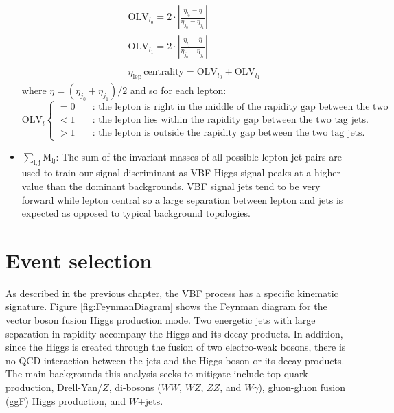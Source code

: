 \begin{itemize}
\begin{eqnarray}
&& \textrm{OLV}_{l_0} = 2 \cdot |\frac{\eta_{l_0}-\bar{\eta}}{\eta_{j_0}-\eta_{j_1}}|  \nonumber\\
&& \textrm{OLV}_{l_1} = 2 \cdot |\frac{\eta_{l_1}-\bar{\eta}}{\eta_{j_0}-\eta_{j_1}}|  \nonumber\\
&&\nonumber \\
&& \eta_{\mathrm{lep}} \, \textrm{centrality} = \textrm{OLV}_{l_0} + \textrm{OLV}_{l_1}
\label{eqn:contOLV_def}
\end{eqnarray}
where $\bar{\eta} = (\eta_{j_0} + \eta_{j_1})/2$ and so for each lepton: 
 \begin{equation}
   \textrm{OLV}_l \left\{
   \begin{array} {ll}
     = 0 & \quad \textrm{:  the lepton is right in the middle of the rapidity gap between the two tag jets.} \\
     < 1 & \quad \textrm{:  the lepton lies within the rapidity gap between the two tag jets.} \\
     >1  & \quad \textrm{:   the lepton is outside the rapidity gap between the two tag jets.} 
    \end{array} \right. 
 \end{equation}
\item $\mathrm{\sum_{l,j} M_{lj}}$: The sum of the invariant masses of all possible lepton-jet pairs are used to train our signal discriminant as VBF Higgs signal peaks at a higher value than the dominant backgrounds. VBF signal jets tend to be very forward while lepton central so a large separation between lepton and jets is expected as opposed to typical background topologies. 
\end{itemize}


\section{Event selection}
As described in the previous chapter, the VBF process has a specific kinematic signature. Figure \ref{fig:FeynmanDiagram} shows the Feynman diagram for the vector boson fusion Higgs production mode. Two energetic jets with large separation in rapidity accompany the Higgs and its decay products. In addition, since the Higgs is created through the fusion of two electro-weak bosons, there is no QCD interaction between the jets and the Higgs boson or its decay products. The main backgrounds this analysis seeks to mitigate include top quark production, Drell-Yan/$Z$, di-bosons ($WW$, $WZ$, $ZZ$, and $W\gamma$), gluon-gluon fusion (ggF) Higgs production, and $W$+jets. 

